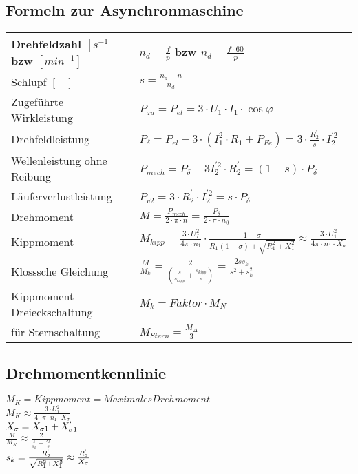      
     
    \subsection{Formeln zur Asynchronmaschine}
    \begin{tabular}[c]{ | p{6cm} | p{9cm} |}
    	\hline
    	Drehfeldzahl $[s^{-1}]$ bzw $[min^{-1}]$ & $n_d=\frac{f}{p}$ bzw
    	$n_d=\frac{f\cdot 60}{p}$\\
    	\hline
    	Schlupf $[-]$ & $s=\frac{n_d-n}{n_d}$\\
    	\hline
    	Zugeführte Wirkleistung & $P_{zu}= P_{el}=3\cdot U_1 \cdot I_1 \cdot
    	\cos\varphi$\\
    	\hline
    	Drehfeldleistung & $P_\delta=P_{el}-3\cdot\left(I_1^2\cdot R_1 +
    	P_{Fe}\right)=3\cdot\frac{R_2^\prime}{s}\cdot I_2^{\prime 2}$\\
    	\hline
    	Wellenleistung ohne Reibung & $P_{mech}=P_\delta-3I_2^{\prime 2}\cdot
    	R_2^\prime=(1-s)\cdot P_\delta$\\
    	\hline
    	Läuferverlustleistung & $P_{v2}=3\cdot R_2^\prime\cdot I_2^{\prime
    	2}=s\cdot P_\delta$\\
    	\hline
    	Drehmoment & $M=\frac{P_{mech}}{2\cdot\pi\cdot
    	n}=\frac{P_\delta}{2\cdot\pi\cdot n_0}$\\
    	\hline
    	Kippmoment & $M_{kipp}=\frac{3\cdot U_I^2}{4\pi\cdot
    	n_1}\cdot\frac{1-\sigma}{R_1(1-\sigma)+\sqrt{R_1^2+X_1^2}}\approx\frac{3\cdot
    	U_1^2}{4\pi\cdot n_1 \cdot X_\sigma}$\\
    	\hline
    	Klosssche Gleichung &
    	$\frac{M}{M_k}=\frac{2}{\left(\frac{s}{s_{kipp}}+\frac{s_{kipp}}{s}\right)}=\frac{2
    	s s_k}{s^2+s_k^2} $\\
    	\hline
    	Kippmoment Dreieckschaltung& $M_k= Faktor \cdot M_N$\\
    	\hline
    	für Sternschaltung & $M_{Stern}= \frac{M_\Delta}{3}$\\
    	\hline
    \end{tabular}
    
    \subsection{Drehmomentkennlinie}
        \begin{minipage}{5cm}
        \end{minipage}
        \begin{minipage}{13cm}
            $M_K = Kippmoment = Maximales Drehmoment$ \\
            $M_K \approx \frac{3 \cdot U_1^2}{4\cdot \pi \cdot n_1 \cdot X_\sigma}$ \\
            $X_\sigma = X_{\sigma 1} + X_{\sigma 1}^`$ \\
            $\frac{M}{M_K}\approx \frac{2}{\frac{s}{s_k}+\frac{s_k}{s}}$ \\
            $s_k = \frac{R_2^`}{\sqrt{R_1^2 + X_1^2}} \approx \frac{R_2^`}{X_\sigma}$    
        \end{minipage}

